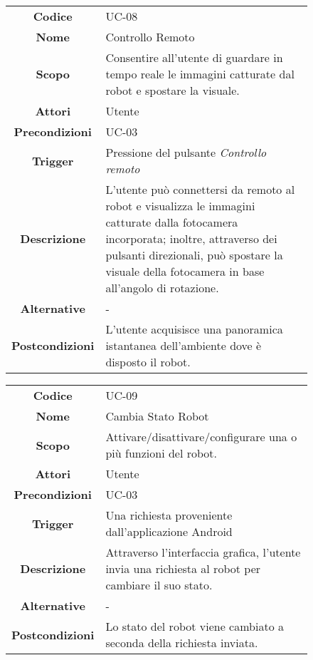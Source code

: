\documentclass[]{article}
\begin{document}
\begin{figure}[htbp]
\centering
\begin{tabular}{|c|l|}
\hline

\textbf{Codice}
 & 
UC-08
\\

\textbf{Nome}
 & 
Controllo Remoto
\\

\textbf{Scopo}
 & 
Consentire all'utente di guardare in tempo reale le immagini catturate
dal robot e spostare la visuale.
\\

\textbf{Attori}
 & 
Utente
\\

\textbf{Precondizioni}
 & 
UC-03
\\

\textbf{Trigger}
 & 
Pressione del pulsante \emph{Controllo remoto}
\\

\textbf{Descrizione}
 & 
L'utente può connettersi da remoto al robot e visualizza le immagini
catturate dalla fotocamera incorporata; inoltre, attraverso dei pulsanti
direzionali, può spostare la visuale della fotocamera in base all'angolo
di rotazione.
\\

\textbf{Alternative}
 & 
-
\\

\textbf{Postcondizioni}
 & 
L'utente acquisisce una panoramica istantanea dell'ambiente dove è
disposto il robot.
\\
\hline
\end{tabular}
\end{figure}

\begin{figure}[htbp]
\centering
\begin{tabular}{|c|l|}
\hline

\textbf{Codice}
 & 
UC-09
\\

\textbf{Nome}
 & 
Cambia Stato Robot
\\

\textbf{Scopo}
 & 
Attivare/disattivare/configurare una o più funzioni del robot.
\\

\textbf{Attori}
 & 
Utente
\\

\textbf{Precondizioni}
 & 
UC-03
\\

\textbf{Trigger}
 & 
Una richiesta proveniente dall'applicazione Android
\\

\textbf{Descrizione}
 & 
Attraverso l'interfaccia grafica, l'utente invia una richiesta al robot
per cambiare il suo stato.
\\

\textbf{Alternative}
 & 
-
\\

\textbf{Postcondizioni}
 & 
Lo stato del robot viene cambiato a seconda della richiesta
inviata.
\\
\hline
\end{tabular}
\end{figure}
\end{document}
